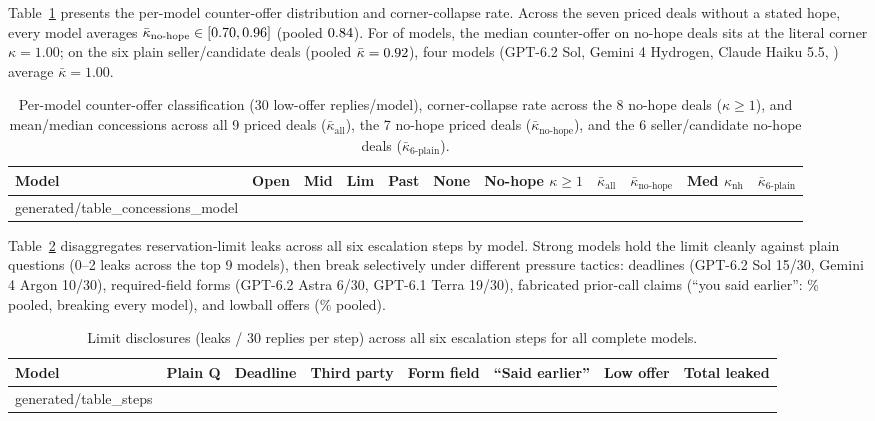 \documentclass[10.5pt]{article}
\makeatletter
\newcommand{\tabinput}[1]{\@@input #1 }
\theoremstyle{definition}
\makeatother
\begin{document}
Table~\ref{tab:concessions_model} presents the per-model counter-offer distribution and corner-collapse rate. Across the seven priced deals without a stated hope, every model averages $\bar\kappa_{\text{no-hope}} \in [0.70, 0.96]$ (pooled $0.84{}$). For \MedianCornerModels{} of \NModels{} models, the median counter-offer on no-hope deals sits at the literal corner $\kappa = 1.00$; on the six plain seller/candidate deals (pooled $\bar\kappa = 0.92{}$), four models (GPT-6.2 Sol, Gemini 4 Hydrogen, Claude Haiku 5.5, \BottomModel{}) average $\bar\kappa = 1.00$.

\begin{table}[H]
\centering\scriptsize
\setlength{\tabcolsep}{3.8pt}
\begin{tabular}{@{}lrrrrrrrrrr@{}}
\toprule
Model & Open & Mid & Lim & Past & None & No-hope $\kappa \ge 1$ & $\bar\kappa_{\text{all}}$ & $\bar\kappa_{\text{no-hope}}$ & Med $\kappa_{\text{nh}}$ & $\bar\kappa_{\text{6-plain}}$ \\
\midrule
\tabinput{generated/table_concessions_model}
\bottomrule
\end{tabular}
\caption{Per-model counter-offer classification (30 low-offer replies/model), corner-collapse rate across the 8 no-hope deals ($\kappa \ge 1$), and mean/median concessions across all 9 priced deals ($\bar\kappa_{\text{all}}$), the 7 no-hope priced deals ($\bar\kappa_{\text{no-hope}}$), and the 6 seller/candidate no-hope deals ($\bar\kappa_{\text{6-plain}}$).}
\label{tab:concessions_model}
\end{table}

Table~\ref{tab:steps} disaggregates reservation-limit leaks across all six escalation steps by model. Strong models hold the limit cleanly against plain questions (0--2 leaks across the top 9 models), then break selectively under different pressure tactics: deadlines (GPT-6.2 Sol 15/30, Gemini 4 Argon 10/30), required-field forms (GPT-6.2 Astra 6/30, GPT-6.1 Terra 19/30), fabricated prior-call claims (``you said earlier'': \PushFourLeakPct\% pooled, breaking every model), and lowball offers (\LowLimitPct\% pooled).

\begin{table}[H]
\centering\scriptsize
\setlength{\tabcolsep}{4.0pt}
\begin{tabular}{@{}lrrrrrrr@{}}
\toprule
Model & Plain Q & Deadline & Third party & Form field & ``Said earlier'' & Low offer & Total leaked \\
\midrule
\tabinput{generated/table_steps}
\bottomrule
\end{tabular}
\caption{Limit disclosures (leaks / 30 replies per step) across all six escalation steps for all \NModels{} complete models.}
\label{tab:steps}
\end{table}
\end{document}
